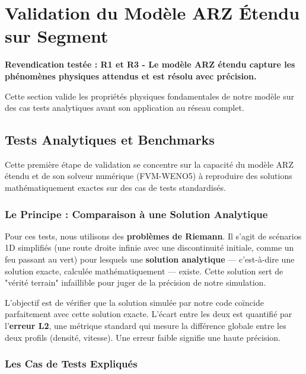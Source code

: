 
\section{Validation du Modèle ARZ Étendu sur Segment}
\label{sec:validation_arz_segment}

\textbf{Revendication testée : R1 et R3 - Le modèle ARZ étendu capture les phénomènes physiques attendus et est résolu avec précision.}

Cette section valide les propriétés physiques fondamentales de notre modèle sur des cas tests analytiques avant son application au réseau complet.

\subsection{Tests Analytiques et Benchmarks}
\label{subsec:tests_analytiques}

Cette première étape de validation se concentre sur la capacité du modèle ARZ étendu et de son solveur numérique (FVM-WENO5) à reproduire des solutions mathématiquement exactes sur des cas de tests standardisés.

\subsubsection{Le Principe : Comparaison à une Solution Analytique}

Pour ces tests, nous utilisons des \textbf{problèmes de Riemann}. Il s'agit de scénarios 1D simplifiés (une route droite infinie avec une discontinuité initiale, comme un feu passant au vert) pour lesquels une \textbf{solution analytique} — c'est-à-dire une solution exacte, calculée mathématiquement — existe. Cette solution sert de "vérité terrain" infaillible pour juger de la précision de notre simulation.

L'objectif est de vérifier que la solution simulée par notre code coïncide parfaitement avec cette solution exacte. L'écart entre les deux est quantifié par l'\textbf{erreur L2}, une métrique standard qui mesure la différence globale entre les deux profils (densité, vitesse). Une erreur faible signifie une haute précision.

\subsubsection{Les Cas de Tests Expliqués}

